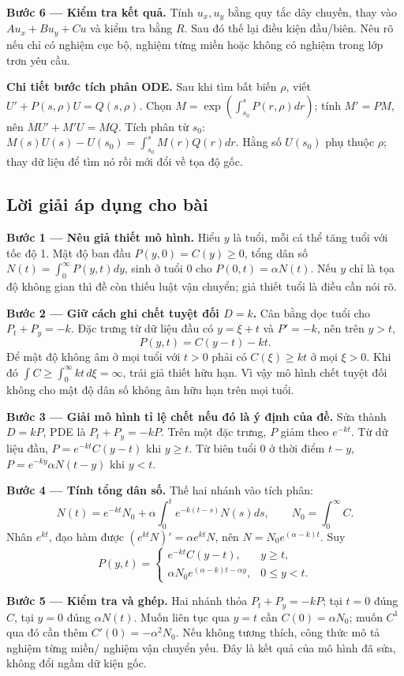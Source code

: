 \documentclass[10pt,a4paper]{article}
\begin{document}
\textbf{Bước 6 — Kiểm tra kết quả.} Tính $u_x,u_y$ bằng quy tắc dây chuyền, thay vào $Au_x+Bu_y+Cu$ và kiểm tra bằng $R$. Sau đó thế lại điều kiện đầu/biên. Nêu rõ nếu chỉ có nghiệm cục bộ, nghiệm từng miền hoặc không có nghiệm trong lớp trơn yêu cầu.

\textbf{Chi tiết bước tích phân ODE.} Sau khi tìm bất biến $\rho$, viết $U'+P(s,\rho)U=Q(s,\rho)$. Chọn $M=\exp(\int_{s_0}^{s}P(r,\rho)dr)$; tính $M'=PM$, nên $MU'+M'U=MQ$. Tích phân từ $s_0$: $M(s)U(s)-U(s_0)=\int_{s_0}^sM(r)Q(r)dr$. Hằng số $U(s_0)$ phụ thuộc $\rho$; thay dữ liệu để tìm nó rồi mới đổi về tọa độ gốc.
\subsection*{Lời giải áp dụng cho bài}
\textbf{Bước 1 — Nêu giả thiết mô hình.} Hiểu $y$ là tuổi, mỗi cá thể tăng tuổi với tốc độ 1. Mật độ ban đầu $P(y,0)=C(y)\ge0$, tổng dân số $N(t)=\int_0^\infty P(y,t)dy$, sinh ở tuổi 0 cho $P(0,t)=\alpha N(t)$. Nếu $y$ chỉ là tọa độ không gian thì đề còn thiếu luật vận chuyển; giả thiết tuổi là điều cần nói rõ.

\textbf{Bước 2 — Giữ cách ghi chết tuyệt đối $D=k$.} Cân bằng dọc tuổi cho $P_t+P_y=-k$. Đặc trưng từ dữ liệu đầu có $y=\xi+t$ và $P'= -k$, nên trên $y>t$,
\[P(y,t)=C(y-t)-kt.\]
Để mật độ không âm ở mọi tuổi với $t>0$ phải có $C(\xi)\ge kt$ ở mọi $\xi>0$. Khi đó $\int C\ge\int_0^\infty kt\,d\xi=\infty$, trái giả thiết hữu hạn. Vì vậy mô hình chết tuyệt đối không cho mật độ dân số không âm hữu hạn trên mọi tuổi.

\textbf{Bước 3 — Giải mô hình tỉ lệ chết nếu đó là ý định của đề.} Sửa thành $D=kP$, PDE là $P_t+P_y=-kP$. Trên một đặc trưng, $P$ giảm theo $e^{-kt}$. Từ dữ liệu đầu, $P=e^{-kt}C(y-t)$ khi $y\ge t$. Từ biên tuổi 0 ở thời điểm $t-y$, $P=e^{-ky}\alpha N(t-y)$ khi $y<t$.

\textbf{Bước 4 — Tính tổng dân số.} Thế hai nhánh vào tích phân:
\[N(t)=e^{-kt}N_0+\alpha\int_0^t e^{-k(t-s)}N(s)ds,\qquad N_0=\int_0^\infty C.\]
Nhân $e^{kt}$, đạo hàm được $(e^{kt}N)'=\alpha e^{kt}N$, nên $N=N_0e^{(\alpha-k)t}$. Suy
\[P(y,t)=\begin{cases}e^{-kt}C(y-t),&y\ge t,\\ \alpha N_0e^{(\alpha-k)t-\alpha y},&0\le y<t.\end{cases}\]

\textbf{Bước 5 — Kiểm tra và ghép.} Hai nhánh thỏa $P_t+P_y=-kP$; tại $t=0$ đúng $C$, tại $y=0$ đúng $\alpha N(t)$. Muốn liên tục qua $y=t$ cần $C(0)=\alpha N_0$; muốn $C^1$ qua đó cần thêm $C'(0)=-\alpha^2N_0$. Nếu không tương thích, công thức mô tả nghiệm từng miền/ nghiệm vận chuyển yếu. Đây là kết quả của mô hình đã sửa, không đổi ngầm dữ kiện gốc.
\end{document}
